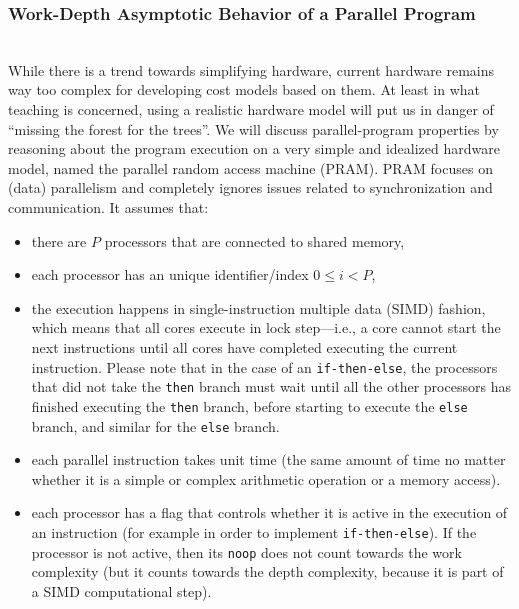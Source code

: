 \documentclass[acmsmall,review]{acmart}\settopmatter{printfolios=true,printccs=false,printacmref=false}
\begin{document}
\subsubsection{Work-Depth Asymptotic Behavior of a Parallel Program}
\label{subsubsub:work-depth}
$\mbox{ }$\\

While there is a trend towards simplifying hardware, current hardware
remains way too complex for developing cost models based on them.
At least in what teaching is concerned, using a realistic hardware
model will put us in danger of ``missing the forest for the trees''. 
We will discuss parallel-program properties by reasoning about the
program execution on a very simple and idealized hardware model, 
named the parallel random access machine (PRAM). PRAM focuses on
(data) parallelism and completely ignores issues related to 
synchronization and communication. It assumes that:
\begin{itemize}
    \item there are $P$ processors that are connected to shared memory,

    \item each processor has an unique identifier/index $0 \leq i < P$,

    \item the execution happens in single-instruction multiple data (SIMD)
            fashion, which means that all cores execute in lock step---i.e.,
            a core cannot start the next instructions until all cores have
            completed executing the current instruction. Please note that
            in the case of an \lstinline{if-then-else}, the processors that
            did not take the \lstinline{then} branch must wait until all the
            other processors has finished executing the \lstinline{then} branch,
            before starting to execute the \lstinline{else} branch, and
            similar for the \lstinline{else} branch.

    \item each parallel instruction takes unit time (the same amount of time
            no matter whether it is a simple or complex arithmetic operation
            or a memory access).

    \item each processor has a flag that controls whether it is active in the
            execution of an instruction (for example in order to implement
            \lstinline{if-then-else}). If the processor is not active, then
            its {\tt noop} does not count towards the work complexity
            (but it counts towards the depth complexity, because it is
            part of a SIMD computational step).
\end{itemize}
\end{document}
